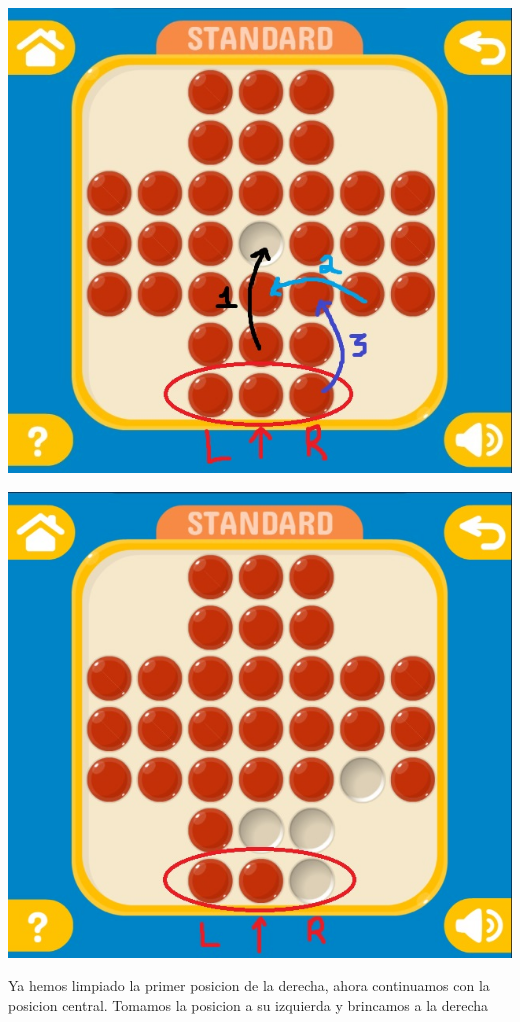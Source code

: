 \documentclass[10pt,a4paper]{report}
\begin{document}
\begin{center}
	\includegraphics[scale=.3]{3.jpg} \hspace{6cm} 
	
	\includegraphics[scale=.3]{4.jpg} \hspace{6cm} 
\end{center}
\pagebreak 
Ya hemos limpiado la primer posicion de la derecha, ahora continuamos con la posicion central. Tomamos la posicion a su izquierda y brincamos a la derecha
\end{document}

